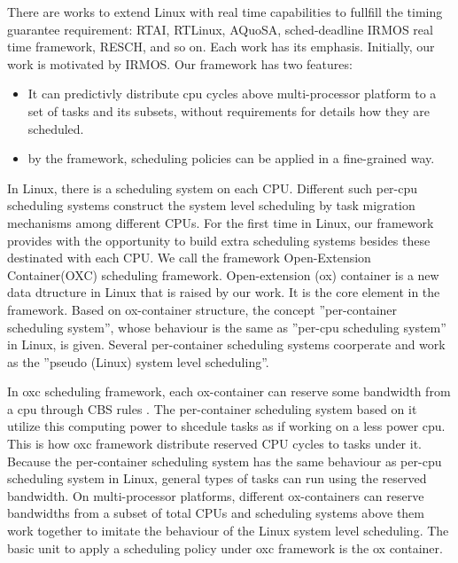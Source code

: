 There are works to extend Linux with real time capabilities to fullfill 
the timing guarantee requirement: RTAI, RTLinux, AQuoSA, sched-deadline
IRMOS real time framework, RESCH, and so on. 
Each work has its emphasis. Initially, our work is motivated by IRMOS.
Our framework has two features:
\begin{itemize}
\item 	It can predictivly distribute cpu 
      	cycles above multi-processor platform to a set of tasks 
	and its subsets, without requirements for details how they 
	are scheduled. 
\item 	by the framework, scheduling policies can be applied in a
	fine-grained way.
\end{itemize}

In Linux, there is a scheduling system on each CPU. Different such per-cpu 
scheduling systems construct the system level scheduling by task
migration mechanisms among different CPUs. 
For the first time in Linux, our framework provides with the opportunity to 
build extra scheduling systems besides these destinated with each CPU.
We call the framework Open-Extension Container(OXC) scheduling framework. 
Open-extension (ox) container is a new data dtructure in Linux that is 
raised by our work. It is the core element in the framework.
Based on ox-container structure, the concept ''per-container scheduling
system'', whose behaviour is the same as ''per-cpu scheduling system''
in Linux, is given. Several per-container scheduling systems coorperate
and work as the ''pseudo (Linux) system level scheduling''.  

In oxc scheduling framework, each ox-container can reserve some bandwidth 
from a cpu through CBS rules \cite{Abe98a}. The per-container scheduling system based on
it utilize this computing power to shcedule tasks as if working on a less
power cpu. This is how oxc framework distribute reserved CPU cycles to
tasks under it. 
Because the per-container scheduling system has the same behaviour
as per-cpu scheduling system in Linux, general types of tasks can run 
using the reserved bandwidth. On multi-processor platforms, different
ox-containers can reserve bandwidths from a subset of total CPUs and 
scheduling systems above them work together to imitate the behaviour of 
the Linux system level scheduling. The basic unit to 
apply a scheduling policy under oxc framework is the ox container.
